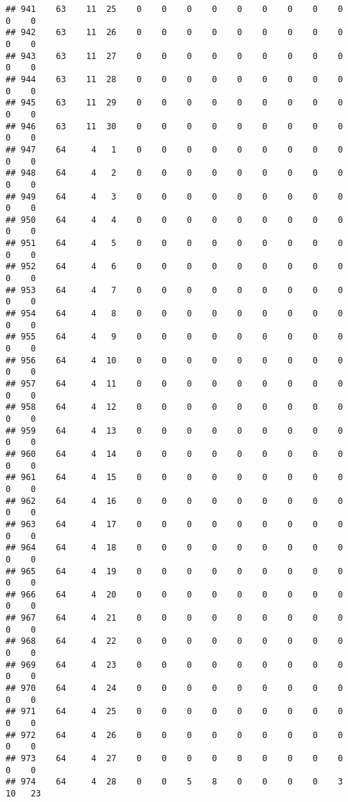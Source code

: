 \documentclass[]{article}
\begin{document}
\begin{verbatim}
## 941    63    11  25    0    0    0    0    0    0    0    0    0    0    0
## 942    63    11  26    0    0    0    0    0    0    0    0    0    0    0
## 943    63    11  27    0    0    0    0    0    0    0    0    0    0    0
## 944    63    11  28    0    0    0    0    0    0    0    0    0    0    0
## 945    63    11  29    0    0    0    0    0    0    0    0    0    0    0
## 946    63    11  30    0    0    0    0    0    0    0    0    0    0    0
## 947    64     4   1    0    0    0    0    0    0    0    0    0    0    0
## 948    64     4   2    0    0    0    0    0    0    0    0    0    0    0
## 949    64     4   3    0    0    0    0    0    0    0    0    0    0    0
## 950    64     4   4    0    0    0    0    0    0    0    0    0    0    0
## 951    64     4   5    0    0    0    0    0    0    0    0    0    0    0
## 952    64     4   6    0    0    0    0    0    0    0    0    0    0    0
## 953    64     4   7    0    0    0    0    0    0    0    0    0    0    0
## 954    64     4   8    0    0    0    0    0    0    0    0    0    0    0
## 955    64     4   9    0    0    0    0    0    0    0    0    0    0    0
## 956    64     4  10    0    0    0    0    0    0    0    0    0    0    0
## 957    64     4  11    0    0    0    0    0    0    0    0    0    0    0
## 958    64     4  12    0    0    0    0    0    0    0    0    0    0    0
## 959    64     4  13    0    0    0    0    0    0    0    0    0    0    0
## 960    64     4  14    0    0    0    0    0    0    0    0    0    0    0
## 961    64     4  15    0    0    0    0    0    0    0    0    0    0    0
## 962    64     4  16    0    0    0    0    0    0    0    0    0    0    0
## 963    64     4  17    0    0    0    0    0    0    0    0    0    0    0
## 964    64     4  18    0    0    0    0    0    0    0    0    0    0    0
## 965    64     4  19    0    0    0    0    0    0    0    0    0    0    0
## 966    64     4  20    0    0    0    0    0    0    0    0    0    0    0
## 967    64     4  21    0    0    0    0    0    0    0    0    0    0    0
## 968    64     4  22    0    0    0    0    0    0    0    0    0    0    0
## 969    64     4  23    0    0    0    0    0    0    0    0    0    0    0
## 970    64     4  24    0    0    0    0    0    0    0    0    0    0    0
## 971    64     4  25    0    0    0    0    0    0    0    0    0    0    0
## 972    64     4  26    0    0    0    0    0    0    0    0    0    0    0
## 973    64     4  27    0    0    0    0    0    0    0    0    0    0    0
## 974    64     4  28    0    0    5    8    0    0    0    0    3   10   23

\end{verbatim}
\end{document}
